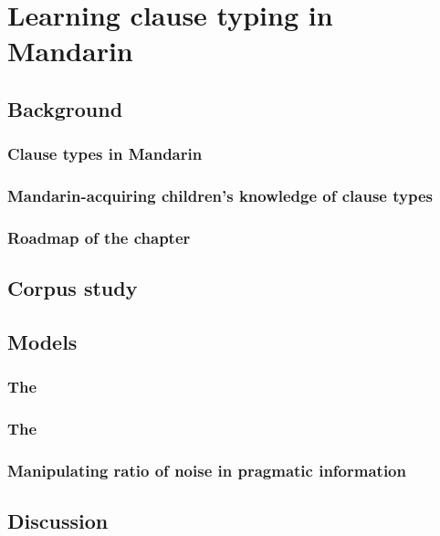 \chapter{Learning clause typing in Mandarin}
\label{chap:man-cl}

\section{Background}
\subsection{Clause types in Mandarin}

\subsection{Mandarin-acquiring children's knowledge of clause types}

\subsection{Roadmap of the chapter}

\section{Corpus study}

\section{Models}
\subsection{The \distlearner{}}
\subsection{The \praglearner{}}
\subsection{Manipulating ratio of noise in pragmatic information}

\section{Discussion}





